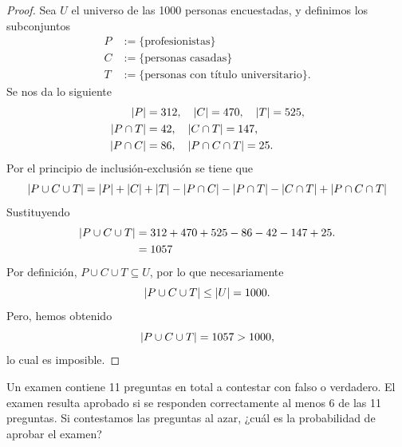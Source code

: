 \documentclass[12pt,a4paper]{article}
\begin{document}
    \begin{proof}
        Sea $U$ el universo de las 1000 personas encuestadas, y definimos los subconjuntos
        \begin{align*}
            P&:=\{\text{profesionistas}\}\\
            C&:=\{\text{personas casadas}\}\\
            T&:=\{\text{personas con título universitario}\}.
        \end{align*}
        Se nos da lo siguiente
        \begin{align*}
            \abs{P}&=312,\quad\abs{C}=470,\quad\abs{T}=525,\\
            \abs{P\cap T}&=42,\quad\abs{C\cap T}=147,\\
            \abs{P\cap C}&=86,\quad\abs{P\cap C\cap T}=25.
        \end{align*}
        Por el principio de inclusión-exclusión se tiene que
        \begin{equation*}
            \abs{P\cup C\cup T}=\abs{P}+\abs{C}+\abs{T}-\abs{P\cap C}-\abs{P\cap T}-\abs{C\cap T}+\abs{P\cap C\cap T}
        \end{equation*}
        Sustituyendo
        \begin{align*}
            \abs{P\cup C\cup T}&=312+470+525-86-42-147+25.\\
            &=1057
        \end{align*}
        Por definición, $P\cup C\cup T\subseteq U$, por lo que necesariamente
        \begin{equation*}
            \abs{P\cup C\cup T}\leq\abs{U}=1000.
        \end{equation*}
        Pero, hemos obtenido
        \begin{equation*}
            \abs{P\cup C\cup T}=1057>1000,
        \end{equation*}
        lo cual es imposible.
    \end{proof}

    \begin{mdframed}[style=mdbluebox,frametitle={Ejercicio 2}]
        Un examen contiene 11 preguntas en total a contestar con falso o verdadero. El examen
        resulta aprobado si se responden correctamente al menos 6 de las 11 preguntas. Si contestamos las
        preguntas al azar, ¿cuál es la probabilidad de aprobar el examen?
    \end{mdframed}
\end{document}
